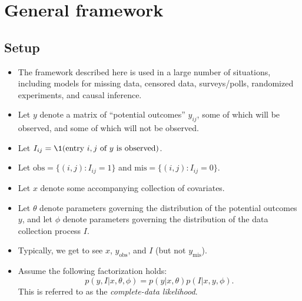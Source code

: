 \documentclass[12pt]{article}
\begin{document}
\section{General framework}

\subsection{Setup}

\begin{itemize}
\item The framework described here is used in a large number of situations, including models for missing data, censored data, surveys/polls, randomized experiments, and causal inference.
\item Let $y$ denote a matrix of ``potential outcomes'' $y_{i j}$, some of which will be observed, and some of which will not be observed.
\item Let $I_{i j} = \1(\text{entry $i,j$ of $y$ is observed})$.
\item Let $\text{obs}= \{(i,j):I_{i j} = 1 \}$ and $\text{mis}= \{(i,j):I_{i j} = 0 \}$.
\item Let $x$ denote some accompanying collection of covariates.
\item Let $\theta$ denote parameters governing the distribution of the potential outcomes $y$, and let $\phi$ denote parameters governing the distribution of the data collection process $I$.
\item Typically, we get to see $x$, $y_\text{obs}$, and $I$ (but not $y_\text{mis}$).
\item Assume the following factorization holds:
$$ p(y,I | x,\theta,\phi) = p(y | x,\theta) p(I | x,y,\phi). $$
This is referred to as the \textit{complete-data likelihood}.
\end{itemize}
\end{document}
